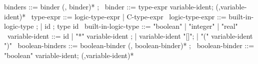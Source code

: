\begin{syntax}
  binders ::= binder (, binder)* ;
  \
  binder ::= type-expr variable-ident;
             (,variable-ident)*
  \
  type-expr ::= logic-type-expr | C-type-expr
  \
  logic-type-expr ::= built-in-logic-type ;
  | id ; type id
  \
  built-in-logic-type ::= "boolean" | "integer" | "real"
  \
  variable-ident ::= id
  | "*" variable-ident ;
  | variable-ident "[]";
  | "(" variable-ident ")"
  \
  boolean-binders ::= boolean-binder (, boolean-binder)* ;
  \
  boolean-binder ::= "boolean" variable-ident;
             (,variable-ident)*
\end{syntax}
